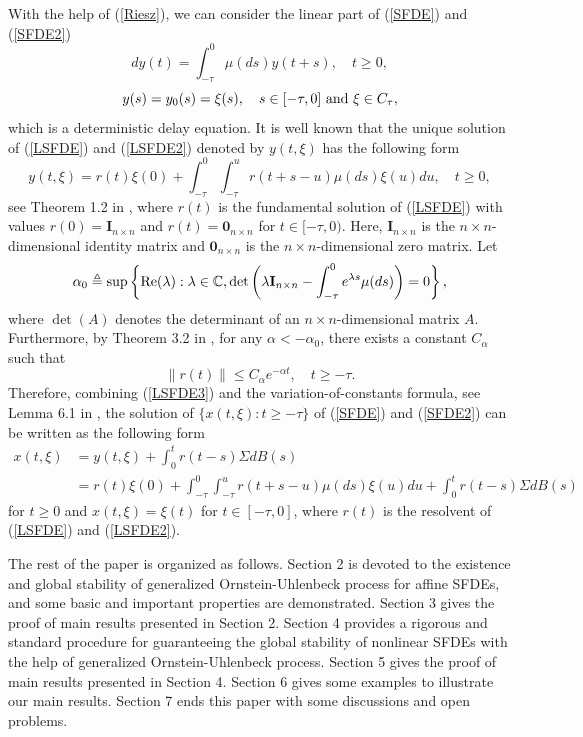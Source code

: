 \documentclass[preprint,12pt]{elsarticle}
\begin{document}
With the help of (\ref{Riesz}), we can consider the linear part of (\ref{SFDE}) and (\ref{SFDE2})
\begin{equation}\label{LSFDE}
  dy(t)=\int_{-\tau}^{0}\mu(ds)y(t+s),\quad t\geq0,
\end{equation}
\begin{equation}\label{LSFDE2}y(s)=y_0(s)=\xi(s),\quad s\in[-\tau,0]\ {\rm and}\ \xi\in C_\tau,
\end{equation}
which is a deterministic delay equation. It is well known that the unique solution of (\ref{LSFDE}) and (\ref{LSFDE2}) denoted by $y(t,\xi)$ has the following form
\begin{equation}\label{LSFDE3}
y(t,\xi)=r(t)\xi(0)+\int_{-\tau}^0\int_{-\tau}^{u}r(t+s-u)\mu(ds)\xi(u)du, \quad t\geq0,
\end{equation}
see Theorem 1.2 in \cite[Chapter 6]{HL}, where $r(t)$ is the fundamental solution of (\ref{LSFDE}) with values $r(0)=\mathbf{I}_{n\times n}$ and $r(t)=\mathbf{0}_{n\times n}$ for $t\in[-\tau,0)$. Here, $\mathbf{I}_{n\times n}$  is the $n\times n$-dimensional identity matrix and $\mathbf{0}_{n\times n}$  is the $n\times n$-dimensional zero matrix.
Let
\begin{equation}\label{Eigen}
\alpha_0\triangleq\sup\left\{{\rm Re}(\lambda):\lambda\in\mathbb{C},\det\left(\lambda\mathbf{I}_{n\times n}-\int_{-\tau}^0e^{\lambda s}\mu(ds)\right)=0\right\},
\end{equation}
where $\det(A)$ denotes the determinant of an  $n\times n$-dimensional matrix $A$. Furthermore, by Theorem 3.2 in \cite[Chapter 9]{HL}, for any $\alpha<-\alpha_0$, there exists a constant $C_\alpha$ such that
\begin{equation}\label{Eigen2}
\|r(t)\|\leq C_\alpha e^{-\alpha t},\quad t\geq-\tau.
\end{equation}
Therefore, combining (\ref{LSFDE3}) and the variation-of-constants formula, see Lemma 6.1 in \cite{RRG}, the solution of $\{x(t,\xi):t\geq-\tau\}$ of (\ref{SFDE}) and (\ref{SFDE2}) can be written as the following form
\begin{align}\label{VCF}
x(t,\xi)&=y(t,\xi)+\int_0^tr(t-s)\Sigma dB(s)\nonumber\\
&=r(t)\xi(0)+\int_{-\tau}^0\int_{-\tau}^{u}r(t+s-u)\mu(ds)\xi(u)du+\int_0^tr(t-s)\Sigma dB(s)
\end{align}
for $t\geq0$ and $x(t,\xi)=\xi(t)$ for $t\in[-\tau,0]$, where $r(t)$ is the resolvent of (\ref{LSFDE}) and (\ref{LSFDE2}).

The rest of the paper is organized as follows. Section 2 is devoted to the existence and global stability of generalized Ornstein-Uhlenbeck process for affine
SFDEs, and some basic and important properties are demonstrated. Section 3 gives the proof of main results presented in Section 2. Section 4 provides a rigorous and standard procedure for guaranteeing the global stability of nonlinear SFDEs with the help of generalized Ornstein-Uhlenbeck process. Section 5 gives the proof of main results presented in Section 4. Section 6 gives some examples to illustrate our main results. Section 7 ends this paper with some discussions and open problems.
\end{document}
